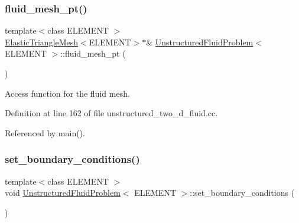 \mbox{\label{classUnstructuredFluidProblem_abc5f7e9929eb6f174eaa49a491489ad9}} 
\subsubsection{\texorpdfstring{fluid\+\_\+mesh\+\_\+pt()}{fluid\_mesh\_pt()}}
{\footnotesize\ttfamily template$<$class E\+L\+E\+M\+E\+NT $>$ \\
\hyperlink{classElasticTriangleMesh}{Elastic\+Triangle\+Mesh}$<$E\+L\+E\+M\+E\+NT$>$$\ast$\& \hyperlink{classUnstructuredFluidProblem}{Unstructured\+Fluid\+Problem}$<$ E\+L\+E\+M\+E\+NT $>$\+::fluid\+\_\+mesh\+\_\+pt (\begin{DoxyParamCaption}{ }\end{DoxyParamCaption})\hspace{0.3cm}{\ttfamily [inline]}}



Access function for the fluid mesh. 



Definition at line 162 of file unstructured\+\_\+two\+\_\+d\+\_\+fluid.\+cc.



Referenced by main().

\mbox{\label{classUnstructuredFluidProblem_a4e57ba31d35b62c9c657c1cfd822ecde}} 
\subsubsection{\texorpdfstring{set\+\_\+boundary\+\_\+conditions()}{set\_boundary\_conditions()}}
{\footnotesize\ttfamily template$<$class E\+L\+E\+M\+E\+NT $>$ \\
void \hyperlink{classUnstructuredFluidProblem}{Unstructured\+Fluid\+Problem}$<$ E\+L\+E\+M\+E\+NT $>$\+::set\+\_\+boundary\+\_\+conditions (\begin{DoxyParamCaption}{ }\end{DoxyParamCaption})}



